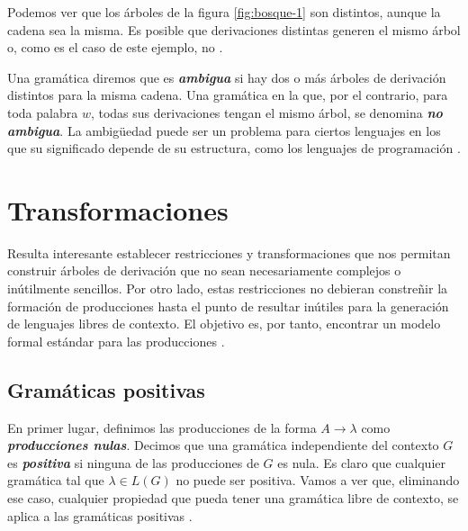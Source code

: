 Podemos ver que los árboles de la figura \ref{fig:bosque-1} son distintos, aunque la cadena sea la misma. Es posible
que derivaciones distintas generen el mismo árbol o, como es el caso de este ejemplo, no \cite{kelley_2001}.

\vspace{10pt}
Una gramática diremos que es \textbf{\textit{ambigua}} si hay dos o más árboles de derivación distintos para la misma
cadena. Una gramática en la que, por el contrario, para toda palabra $w$, todas sus derivaciones tengan el mismo árbol,
se denomina \textbf{\textit{no ambigua}}. La ambigüedad puede ser un problema para ciertos lenguajes en los que su
significado depende de su estructura, como los lenguajes de programación \cite{kelley_2001}.

\section{Transformaciones}

Resulta interesante establecer restricciones y transformaciones que nos permitan construir árboles de derivación que
no sean necesariamente complejos o inútilmente sencillos. Por otro lado, estas restricciones no debieran constreñir la
formación de producciones hasta el punto de resultar inútiles para la generación de lenguajes libres de contexto. El
objetivo es, por tanto, encontrar un modelo formal estándar para las producciones \cite{kelley_2001}.

\subsection{Gramáticas positivas}

\vspace{10pt}
En primer lugar, definimos las producciones de la forma $A\to\lambda$ como \textbf{\textit{producciones nulas}}. 
Decimos que una gramática independiente del contexto $G$ es \textbf{\textit{positiva}} si ninguna de las producciones 
de $G$ es nula. Es claro que cualquier gramática tal que $\lambda\in L(G)$ no puede ser positiva. Vamos a ver que, 
eliminando ese caso, cualquier propiedad que pueda tener una gramática libre de contexto, se aplica a las gramáticas 
positivas \cite{davis_sigal_weyuker_1994}.

